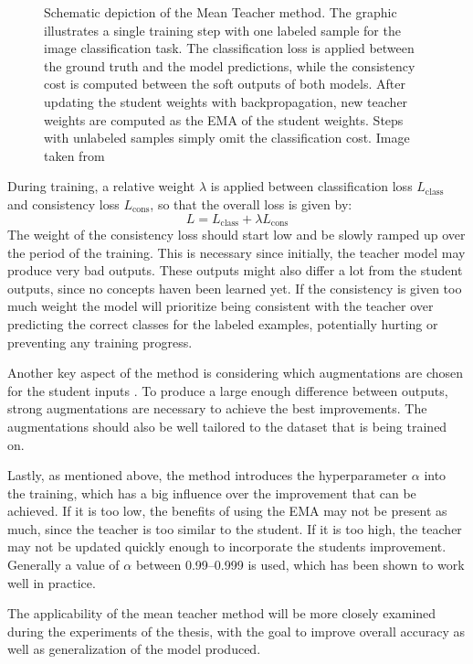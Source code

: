 \begin{figure}[htbp]
   \caption{Schematic depiction of the Mean Teacher method. The graphic illustrates a single training step with one labeled sample for the image classification task. The classification loss is applied between the ground truth and the model predictions, while the consistency cost is computed between the soft outputs of both models. After updating the student weights with backpropagation, new teacher weights are computed as the EMA of the student weights. Steps with unlabeled samples simply omit the classification cost. Image taken from \cite{tarvainenMeanTeachersAre2018}}
   \label{fig:mean_teacher}
\end{figure}

During training, a relative weight $\lambda$ is applied between classification loss $L_\text{class}$ and consistency loss $L_\text{cons}$, so that the overall loss is given by:
$$
    L = L_\text{class} + \lambda L_\text{cons}
$$
The weight of the consistency loss should start low and be slowly ramped up over the period of the training. 
This is necessary since initially, the teacher model may produce very bad outputs.
These outputs might also differ a lot from the student outputs, since no concepts haven been learned yet. 
If the consistency is given too much weight the model will prioritize being consistent with the teacher over predicting the correct classes for the labeled examples, potentially hurting or preventing any training progress. 

Another key aspect of the method is considering which augmentations are chosen for the student inputs \cite{tarvainenMeanTeachersAre2018}. To produce a large enough difference between outputs, strong augmentations are necessary to achieve the best improvements. The augmentations should also be well tailored to the dataset that is being trained on. 

Lastly, as mentioned above, the method introduces the hyperparameter $\alpha$ into the training, which has a big influence over the improvement that can be achieved. If it is too low, the benefits of using the EMA may not be present as much, since the teacher is too similar to the student. If it is too high, the teacher may not be updated quickly enough to incorporate the students improvement. 
Generally a value of $\alpha$ between \numrange{0.99}{0.999} is used, which has been shown to work well in practice.

The applicability of the mean teacher method will be more closely examined during the experiments of the thesis, with the goal to improve overall accuracy as well as generalization of the model produced. 